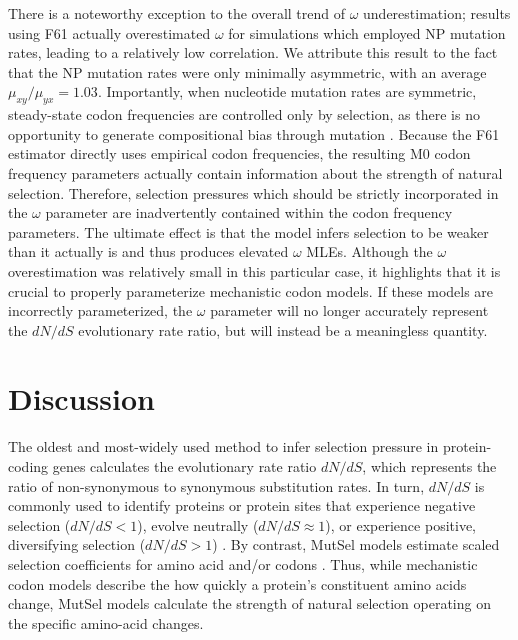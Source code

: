 \documentclass{pnastwo}
\begin{document}
\begin{article}
There is a noteworthy exception to the overall trend of $\omega$ underestimation; results using F61 actually overestimated $\omega$ for simulations which employed NP mutation rates, leading to a relatively low correlation. We attribute this result to the fact that the NP mutation rates were only minimally asymmetric, with an average $\mu_{xy}/\mu_{yx} = 1.03$. Importantly, when nucleotide mutation rates are symmetric, steady-state codon frequencies are controlled only by selection, as there is no opportunity to generate compositional bias through mutation \cite{SellaHirsh2005}. Because the F61 estimator directly uses empirical codon frequencies, the resulting M0 codon frequency parameters actually contain information about the strength of natural selection. Therefore, selection pressures which should be strictly incorporated in the $\omega$ parameter are inadvertently contained within the codon frequency parameters. The ultimate effect is that the model infers selection to be weaker than it actually is and thus produces elevated $\omega$ MLEs. Although the $\omega$ overestimation was relatively small in this particular case, it highlights that it is crucial to properly parameterize mechanistic codon models. If these models are incorrectly parameterized, the $\omega$ parameter will no longer accurately represent the $dN/dS$ evolutionary rate ratio, but will instead be a meaningless quantity.



\section*{Discussion}

The oldest and most-widely used method to infer selection pressure in protein-coding genes calculates the evolutionary rate ratio $dN/dS$, which represents the ratio of non-synonymous to synonymous substitution rates. In turn, $dN/dS$ is commonly used to identify proteins or protein sites that experience negative selection ($dN/dS<1$), evolve neutrally ($dN/dS\approx1$), or experience positive, diversifying selection ($dN/dS>1$) \cite{NielsenYang1998, Yangetal2000, KosakovskyPondFrost2005}. By contrast, MutSel models estimate scaled selection coefficients for amino acid and/or codons \cite{HalpernBruno1998,Rodrigueetal2010,Tamurietal2012,Thorne2012,Tamurietal2014}. Thus, while mechanistic codon models describe the how quickly a protein's constituent amino acids change, MutSel models calculate the strength of natural selection operating on the specific amino-acid changes.  


\end{article}
\end{document}
